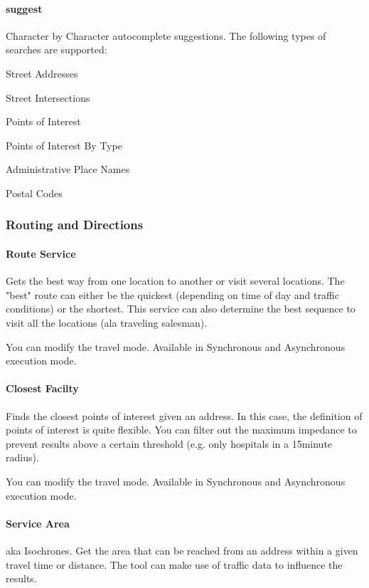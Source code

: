 \documentclass{vgtc}                          %
\begin{document}
\paragraph{suggest}
Character by Character autocomplete suggestions. The following types of searches are supported:

\begin{enumerate*}
	\item Street Addresses
	\item Street Intersections
	\item Points of Interest
	\item Points of Interest By Type
	\item Administrative Place Names
	\item Postal Codes
\end{enumerate*}

\subsubsection{Routing and Directions}

\paragraph{Route Service}
Gets the best way from one location to another or visit several locations. The "best" route can either be the quickest (depending on time of day and traffic conditions) or the shortest. This service can also determine the best sequence to visit all the locations (ala traveling salesman). 

You can modify the travel mode. Available in Synchronous and Asynchronous execution mode. 

\paragraph{Closest Facilty}
Finds the closest points of interest given an address. In this case, the definition of points of interest is quite flexible. You can filter out the maximum impedance to prevent results above a certain threshold (e.g. only hospitals in a 15minute radius). 

You can modify the travel mode. Available in Synchronous and Asynchronous execution mode.

\paragraph{Service Area} aka Isochrones.
Get the area that can be reached from an address within a given travel time or distance. The tool can make use of traffic data to influence the results. 
\end{document}
